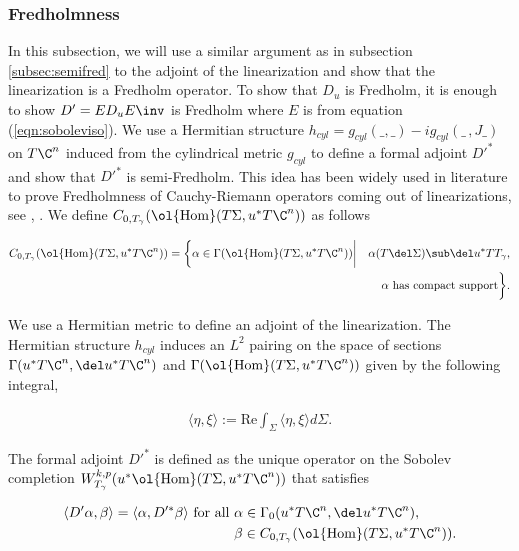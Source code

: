 \subsubsection{Fredholmness}
In this subsection, we will use a similar argument as in subsection \ref{subsec:semifred} to the adjoint of the linearization and show that the linearization is a Fredholm operator. To show that $D_u$ is Fredholm, it is enough to show $D'= ED_uE\inv$ is Fredholm where $E$ is from equation (\ref{eqn:soboleviso}). We use a Hermitian structure $h_{cyl}= g_{cyl}(\_ ,\_) -ig_{cyl}(\_\,,J\_)$ on $T\C^n$ induced from the cylindrical metric $g_{cyl}$ to define a formal adjoint $D'^*$ and show that $D'^*$ is semi-Fredholm. This idea has been widely used in literature to prove Fredholmness of Cauchy-Riemann operators coming out of linearizations, see \cite{wendlSFT}, \cite{jholobook} . We define $C _{0,T_\gamma}( \ol{\operatorname{Hom}}( T\Sigma,u^*T\C^n))$ as follows

\begin{align*}
    C _{0,T_\gamma}( \ol{\operatorname{Hom}}(T\Sigma,u^*T\C^n)) = \bigg\{\alpha \in  \Gamma (\ol{\operatorname{Hom}}(T\Sigma,u^*T\C^n)) \bigg|  \quad \alpha( T \del \Sigma ) \sub \del u ^* T T_\gamma , \\ \alpha \text { has compact support}\bigg\}.
\end{align*}



We use a Hermitian metric to define an adjoint of the linearization. The Hermitian structure $h_{cyl}$ induces an $L^2$ pairing on the space of sections $\Gamma(u^*T\C^n,\del u^*T\C^n)$ and $\Gamma (\ol{\operatorname{Hom}}(T\Sigma,u^*T\C^n))$ given by the  following integral,

\begin{align*}
    \langle \eta,\xi \rangle := \text{Re} \int_\Sigma \langle \eta, \xi \rangle d\Sigma.
\end{align*}

\noindent The formal adjoint $D'^*$ is defined as the unique operator on the Sobolev completion $W^{k,p}_{T_\gamma} ( u^*\ol {\operatorname{Hom}}(T\Sigma,u^*T\C^n))$  that satisfies 

\begin{align*}
    \langle D' \alpha , \beta   \rangle = \langle \alpha , D'^* \beta \rangle \text {   for all  } &\alpha \in \Gamma_0(u^*T\C^n,\del u^*T\C^n), \\ 
    &\beta \in C _{0,T_\gamma}(\ol {\operatorname{Hom}}(T\Sigma,u^*T\C^n)).
\end{align*}


